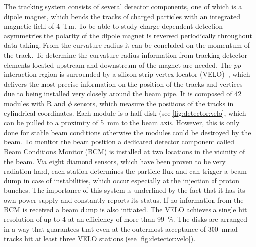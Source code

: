The tracking system consists of several detector components, one of which is a
dipole magnet, which bends the tracks of charged particles with an integrated
magnetic field of \SI{4}{Tm}. To be able to study charge-dependent detection
asymmetries the polarity of the dipole magnet is reversed periodically
throughout data-taking. From the curvature radius it can be concluded on
the momentum of the track. To determine the curvature radius information from
tracking detector elements located upstream and downstream of the magnet are
needed. The $pp$ interaction region is surrounded by a silicon-strip vertex
locator (VELO)~\cite{LHCb-DP-2014-001}, which delivers the most precise
information on the position of the tracks and vertices due to being installed
very closely around the beam pipe. It is composed of 42 modules with R and
$\phi$ sensors, which measure the positions of the tracks in cylindrical
coordinates. Each module is a half disk (see \cref{fig:detector:velo}, which
can be pulled to a proximity of \SI{5}{\milli\metre} to the beam axis.
However, this is only done for stable beam conditions otherwise the modules
could be destroyed by the beam. To monitor the beam position a dedicated
detector component called Beam Conditions Monitor (BCM) is installed at two
locations in the vicinity of the beam. Via eight diamond sensors, which have
been proven to be very radiation-hard, each station determines the particle
flux and can trigger a beam dump in case of instabilities, which occur
especially at the injection of proton bunches. The importance of this system
is underlined by the fact that it has its own power supply and constantly
reports its status. If no information from the BCM is received a beam dump is
also initiated. The VELO achieves a single hit resolution of up to \SI{4}{\mum}
at an efficiency of more than \SI{99}{\percent}. The disks are arranged in a
way that guarantees that even at the outermost acceptance of \SI{300}{mrad}
tracks hit at least three VELO stations (see \cref{fig:detector:velo}).
